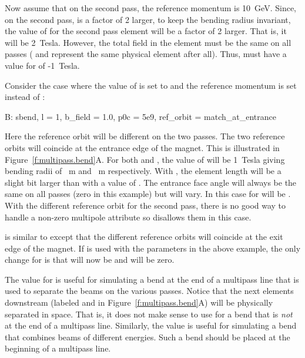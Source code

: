 Now assume that on the second pass, the reference momentum is 10~GeV.
Since, on the second pass,  is a factor of 2 larger, to keep
the bending radius invariant, the value of  for the second
pass element  will be a factor of 2 larger. That is, it will
be 2~Tesla. However, the total field in the element must be the
same on all passes ( and  represent the same
physical element after all). Thus,  must have a value for
 of -1~Tesla.

Consider the case where the value of
 is set to  and the reference
momentum is set instead of :
\begin{example} 
  B: sbend, l = 1, b_field = 1.0, p0c = 5e9, ref_orbit = match_at_entrance
\end{example}
Here the reference orbit will be different on the two passes. The two
reference orbits will coincide at the entrance edge of the magnet.
This is illustrated in Figure~\ref{f:multipass.bend}A. For both
 and , the value of  will be 1~Tesla
giving bending radii of ~m and ~m respectively. With
, the element length will be a slight bit larger than
 with a value of . The entrance face angle
 will always be the same on all passes (zero in this example)
but  will vary. In this case  for  will be
. With the different reference orbit for the second pass,
there is no good way to handle a non-zero multipole attribute so \bmad
disallows them in this case.

 is similar to  except that
the different reference orbits will coincide at the exit edge of the
magnet. If  is used with the parameters in the above
example, the only change for  is that  will now be
 and  will be zero.

The  value for  is useful
for simulating a bend at the end of a multipass line that is used to
separate the beams on the various passes. Notice that the next
elements downstream (labeled  and  in
Figure~\ref{f:multipass.bend}A) will be physically separated in
space. That is, it does not make sense to use 
for a bend that is {\em not} at the end of a multipass
line. Similarly, the  value is useful for simulating
a bend that combines beams of different energies. Such a bend should
be placed at the beginning of a multipass line.


